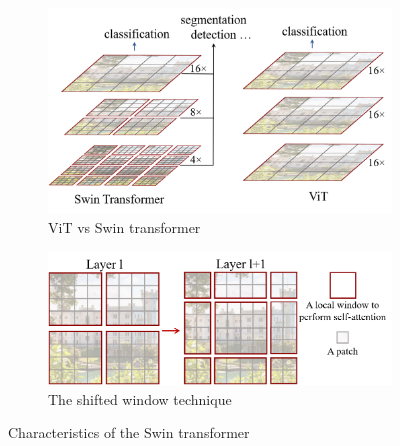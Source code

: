 \begin{figure}[ht]
    \centering
    \begin{subfigure}{0.45\textwidth}
        \centering
        \includegraphics[width=\linewidth]{teaser11.png}
        \caption{ViT vs Swin transformer}
        \label{fig:swin-vit}
    \end{subfigure}\hfill
    \begin{subfigure}{0.45\textwidth}
        \centering
        \includegraphics[width=\linewidth]{teaser_v4.png}
        \caption{The shifted window technique}
        \label{fig:shiftwindow}
    \end{subfigure}
    \caption{Characteristics of the Swin transformer\cite{DBLP:journals/corr/abs-2103-14030}}
    \label{fig:swintransform}
\end{figure}

